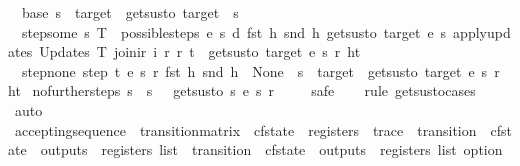 \begin{isabellebody}
\ \ base{\isacharcolon}\ {\isachardoublequoteopen}s\ {\isacharequal}\ target\ {\isasymLongrightarrow}\ gets{\isacharunderscore}us{\isacharunderscore}to\ target\ {\isacharunderscore}\ s\ {\isacharunderscore}\ {\isacharbrackleft}{\isacharbrackright}{\isachardoublequoteclose}\ {\isacharbar}\isanewline
\ \ step{\isacharunderscore}some{\isacharcolon}\ {\isachardoublequoteopen}{\isasymexists}{\isacharparenleft}s{\isacharprime}{\isacharcomma}\ T{\isacharparenright}\ {\isacharbar}{\isasymin}{\isacharbar}\ possible{\isacharunderscore}steps\ e\ s\ d\ {\isacharparenleft}fst\ h{\isacharparenright}\ {\isacharparenleft}snd\ h{\isacharparenright}{\isachardot}\ gets{\isacharunderscore}us{\isacharunderscore}to\ target\ e\ s{\isacharprime}\ {\isacharparenleft}apply{\isacharunderscore}updates\ {\isacharparenleft}Updates\ T{\isacharparenright}\ {\isacharparenleft}join{\isacharunderscore}ir\ i\ r{\isacharparenright}\ r{\isacharparenright}\ t\ {\isasymLongrightarrow}\ gets{\isacharunderscore}us{\isacharunderscore}to\ target\ e\ s\ r\ {\isacharparenleft}h{\isacharhash}t{\isacharparenright}{\isachardoublequoteclose}\ {\isacharbar}\isanewline
\ \ step{\isacharunderscore}none{\isacharcolon}\ {\isachardoublequoteopen}step\ t\ e\ s\ r\ {\isacharparenleft}fst\ h{\isacharparenright}\ {\isacharparenleft}snd\ h{\isacharparenright}\ {\isacharequal}\ None\ {\isasymLongrightarrow}\ s\ {\isacharequal}\ target\ {\isasymLongrightarrow}\ gets{\isacharunderscore}us{\isacharunderscore}to\ target\ e\ s\ r\ {\isacharparenleft}h{\isacharhash}t{\isacharparenright}{\isachardoublequoteclose}\isanewline
\isanewline
{}\isamarkupfalse%
\ no{\isacharunderscore}further{\isacharunderscore}steps{\isacharcolon}\ {\isachardoublequoteopen}s\ {\isasymnoteq}\ s{\isacharprime}\ {\isasymLongrightarrow}\ {\isasymnot}\ gets{\isacharunderscore}us{\isacharunderscore}to\ s\ e\ s{\isacharprime}\ r\ {\isacharbrackleft}{\isacharbrackright}{\isachardoublequoteclose}\isanewline
%
\isadelimproof
\ \ %
\endisadelimproof
%
\isatagproof
{}\isamarkupfalse%
\ safe\isanewline
\ \ \isamarkupfalse%
\ {\isacharparenleft}rule\ gets{\isacharunderscore}us{\isacharunderscore}to{\isachardot}cases{\isacharparenright}\isanewline
\ \ \isamarkupfalse%
\ auto%
\endisatagproof
{\isafoldproof}%
%
\isadelimproof
\isanewline
%
\endisadelimproof
\isanewline
{}\isamarkupfalse%
\ accepting{\isacharunderscore}sequence\ {\isacharcolon}{\isacharcolon}\ {\isachardoublequoteopen}transition{\isacharunderscore}matrix\ {\isasymRightarrow}\ cfstate\ {\isasymRightarrow}\ registers\ {\isasymRightarrow}\ trace\ {\isasymRightarrow}\ {\isacharparenleft}transition\ {\isasymtimes}\ cfstate\ {\isasymtimes}\ outputs\ {\isasymtimes}\ registers{\isacharparenright}\ list\ {\isasymRightarrow}\ {\isacharparenleft}transition\ {\isasymtimes}\ cfstate\ {\isasymtimes}\ outputs\ {\isasymtimes}\ registers{\isacharparenright}\ list\ option{\isachardoublequoteclose}\ \isanewline

\end{isabellebody}
